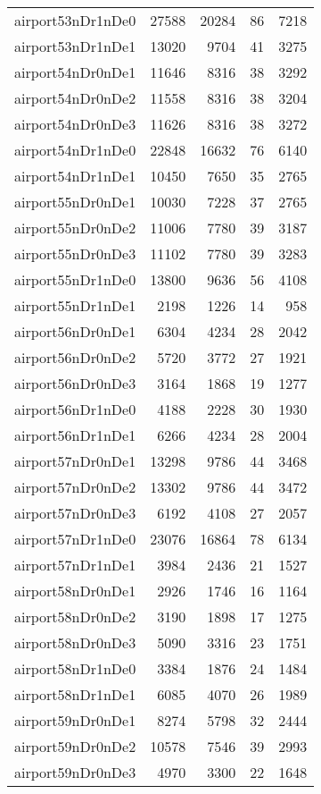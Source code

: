 \begin{tabular}{lrrrr}
airport53nDr1nDe0 & 27588 & 20284 & 86 & 7218 \\
airport53nDr1nDe1 & 13020 & 9704 & 41 & 3275 \\
airport54nDr0nDe1 & 11646 & 8316 & 38 & 3292 \\
airport54nDr0nDe2 & 11558 & 8316 & 38 & 3204 \\
airport54nDr0nDe3 & 11626 & 8316 & 38 & 3272 \\
airport54nDr1nDe0 & 22848 & 16632 & 76 & 6140 \\
airport54nDr1nDe1 & 10450 & 7650 & 35 & 2765 \\
airport55nDr0nDe1 & 10030 & 7228 & 37 & 2765 \\
airport55nDr0nDe2 & 11006 & 7780 & 39 & 3187 \\
airport55nDr0nDe3 & 11102 & 7780 & 39 & 3283 \\
airport55nDr1nDe0 & 13800 & 9636 & 56 & 4108 \\
airport55nDr1nDe1 & 2198 & 1226 & 14 & 958 \\
airport56nDr0nDe1 & 6304 & 4234 & 28 & 2042 \\
airport56nDr0nDe2 & 5720 & 3772 & 27 & 1921 \\
airport56nDr0nDe3 & 3164 & 1868 & 19 & 1277 \\
airport56nDr1nDe0 & 4188 & 2228 & 30 & 1930 \\
airport56nDr1nDe1 & 6266 & 4234 & 28 & 2004 \\
airport57nDr0nDe1 & 13298 & 9786 & 44 & 3468 \\
airport57nDr0nDe2 & 13302 & 9786 & 44 & 3472 \\
airport57nDr0nDe3 & 6192 & 4108 & 27 & 2057 \\
airport57nDr1nDe0 & 23076 & 16864 & 78 & 6134 \\
airport57nDr1nDe1 & 3984 & 2436 & 21 & 1527 \\
airport58nDr0nDe1 & 2926 & 1746 & 16 & 1164 \\
airport58nDr0nDe2 & 3190 & 1898 & 17 & 1275 \\
airport58nDr0nDe3 & 5090 & 3316 & 23 & 1751 \\
airport58nDr1nDe0 & 3384 & 1876 & 24 & 1484 \\
airport58nDr1nDe1 & 6085 & 4070 & 26 & 1989 \\
airport59nDr0nDe1 & 8274 & 5798 & 32 & 2444 \\
airport59nDr0nDe2 & 10578 & 7546 & 39 & 2993 \\
airport59nDr0nDe3 & 4970 & 3300 & 22 & 1648 \\

\end{tabular}
